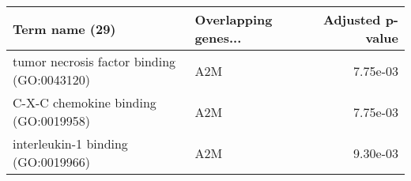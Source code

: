 \begin{tabular}{llr}
\toprule
                            Term name (29) & Overlapping genes... &  Adjusted p-value \\
\midrule
tumor necrosis factor binding (GO:0043120) &                  A2M &          7.75e-03 \\
      C-X-C chemokine binding (GO:0019958) &                  A2M &          7.75e-03 \\
        interleukin-1 binding (GO:0019966) &                  A2M &          9.30e-03 \\
\bottomrule
\end{tabular}
